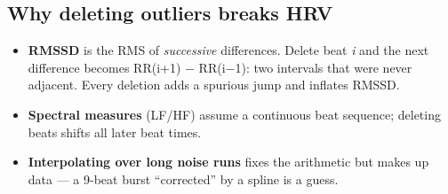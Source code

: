 \documentclass[11pt,a4paper]{article}
\begin{document}
\subsection{Why deleting outliers breaks HRV}\label{sec:why-deleting-outliers-breaks-hrv}
\begin{itemize}
\item \textbf{RMSSD} is the RMS of \emph{successive} differences. Delete beat \emph{i} and the next difference becomes RR(i+1) − RR(i−1): two intervals that were never adjacent. Every deletion adds a spurious jump and inflates RMSSD.
\item \textbf{Spectral measures} (LF/HF) assume a continuous beat sequence; deleting beats shifts all later beat times.
\item \textbf{Interpolating over long noise runs} fixes the arithmetic but makes up data — a 9-beat burst ``corrected'' by a spline is a guess.
\end{itemize}
\end{document}
